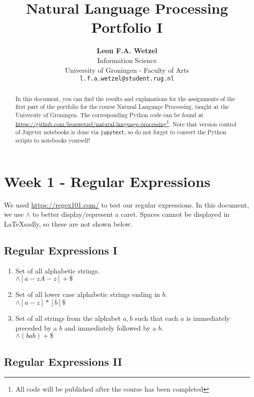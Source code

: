 \documentclass[a4paper, 11pt]{article}
\title{\textbf{Natural Language Processing}\\Portfolio I}
\author{\textbf{Leon F.A. Wetzel}\\ Information Science \\ University of Groningen - Faculty of Arts\\ \texttt{l.f.a.wetzel@student.rug.nl}}
\begin{document}
\maketitle

\begin{abstract}
	
	In this document, you can find the results and explanations for the assignments of the first part of the portfolio for the course Natural Language Processing, taught at the University of Groningen. The corresponding Python code can be found at \url{https://github.com/leonwetzel/natural-language-processing}\footnote{All code will be published after the course has been completed}. Note that version control of Jupyter notebooks is done via \texttt{jupytext}, so do not forget to convert the Python scripts to notebooks yourself!

\end{abstract}

\section{Week 1 - Regular Expressions}

We used \url{https://regex101.com/} to test our regular expressions. In this document, we use \texttt{$\wedge$} to better display/represent a caret. Spaces cannot be displayed in \LaTeX  sadly, so these are not shown below.

\subsection{Regular Expressions I}

\begin{enumerate}
	\item Set of all alphabetic strings. \\ $ \wedge [a-zA-z ]+\$ $
	
	\item Set of all lower case alphabetic strings ending in $b$. \\ $\wedge [a-z ]*[b]\$ $
	
	\item Set of all strings from the alphabet ${a,b}$ such that each $a$ is immediately preceded by a $b$ and immediately followed by a $b$. \\$\wedge(bab)+\$ $
\end{enumerate}

\subsection{Regular Expressions II}
\end{document}
